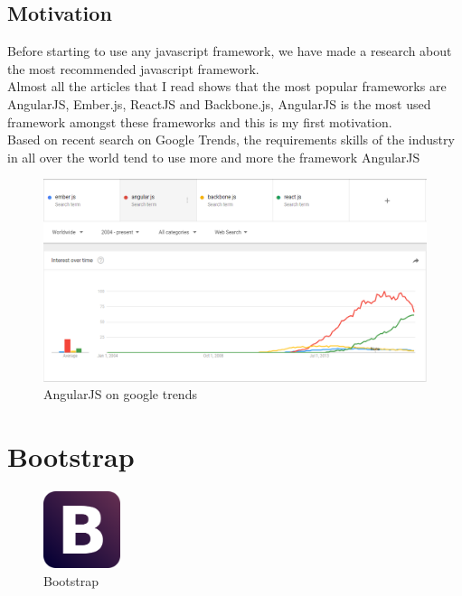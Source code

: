 \documentclass[12pt]{article}
\begin{document}
	\subsection{Motivation}
	Before starting to use any javascript framework, we have made a research about the most recommended javascript framework.
	\\
	Almost all the articles that I read shows that the most popular frameworks are \colorbox{mygray}{AngularJS}, \colorbox{mygray}{Ember.js}, \colorbox{mygray}{ReactJS} and \colorbox{mygray}{Backbone.js}, AngularJS is the most used framework amongst these frameworks and this is my first motivation.\\
    Based on recent search on Google Trends, the requirements skills  of the industry in all over the world tend  to use more and more the framework AngularJS
	 	\begin{figure}[h]
	 	\centering
	 	\includegraphics[width=1.0\textwidth]{AngularJS_statics_google_trends.png}
	 	\caption{AngularJS on google trends}
	 \end{figure}
	 

\clearpage
\newpage

	\section{Bootstrap}
	\begin{figure}[h]
		\centering
		\includegraphics[width=0.20\textwidth]{Boostrap_logo.png}
		\caption{Bootstrap}
	\end{figure}
\end{document}
